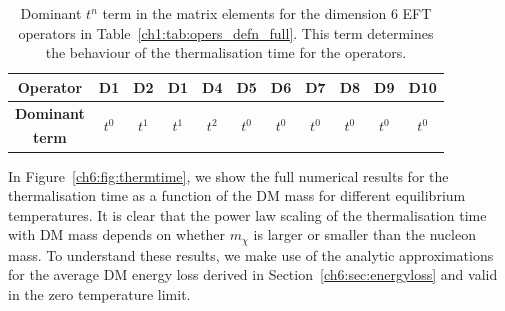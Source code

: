 \begin{table}[t!bp]
  \centering
  \begin{tabular}{c c c c c c c c c c c}
    \toprule
    \textbf{Operator} & D1 & D2 & D1 & D4 & D5 & D6 & D7 & D8 & D9 & D10\\
    \midrule\midrule
    \textbf{Dominant} & \multirow{2}{*}{$t^0$} & \multirow{2}{*}{$t^1$} & \multirow{2}{*}{$t^1$} & \multirow{2}{*}{$t^2$} & \multirow{2}{*}{$t^0$} & \multirow{2}{*}{$t^0$} & \multirow{2}{*}{$t^0$} & \multirow{2}{*}{$t^0$} & \multirow{2}{*}{$t^0$} & \multirow{2}{*}{$t^0$} \\
    \textbf{term} \bm{$\tth$} & & & & & & & & & &\\
    \bottomrule
  \end{tabular}
  \caption{Dominant $t^n$ term in the matrix elements for the dimension 6 EFT operators in Table~\ref{ch1:tab:opers_defn_full}. This term determines the behaviour of the thermalisation time for the operators.}
  \label{ch6:tab:dominanttn}
\end{table}


In Figure~\ref{ch6:fig:thermtime}, we show the full numerical results for the thermalisation time as a function of the DM mass for different equilibrium temperatures. It is clear that the power law scaling of the thermalisation time with DM mass depends on whether $m_\chi$ is larger or smaller than the nucleon mass. To understand these results, we make use of the analytic approximations for the average DM energy loss derived in Section~\ref{ch6:sec:energyloss} and valid in the zero temperature limit. 

